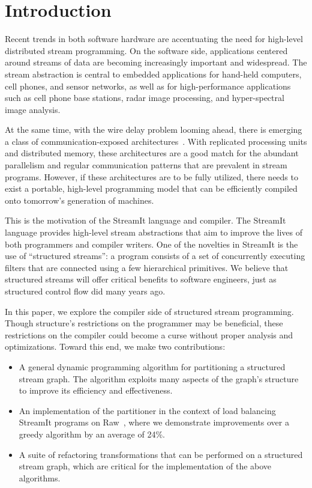 \section{Introduction}

Recent trends in both software hardware are accentuating the need for
high-level distributed stream programming.  On the software side,
applications centered around streams of data are becoming increasingly
important and widespread.  The stream abstraction is central to
embedded applications for hand-held computers, cell phones, and sensor
networks, as well as for high-performance applications such as cell
phone base stations, radar image processing, and hyper-spectral image
analysis.  

At the same time, with the wire delay problem looming ahead, there is
emerging a class of communication-exposed
architectures~\cite{raw-micro,trips,smartmemories}.  With replicated
processing units and distributed memory, these architectures are a
good match for the abundant parallelism and regular communication
patterns that are prevalent in stream programs.  However, if these
architectures are to be fully utilized, there needs to exist a
portable, high-level programming model that can be efficiently
compiled onto tomorrow's generation of machines.

This is the motivation of the StreamIt language and compiler.  The
StreamIt language provides high-level stream abstractions that aim to
improve the lives of both programmers and compiler writers.  One of
the novelties in StreamIt is the use of ``structured streams'': a
program consists of a set of concurrently executing filters that are
connected using a few hierarchical primitives.  We believe that
structured streams will offer critical benefits to software engineers,
just as structured control flow did many years ago.

In this paper, we explore the compiler side of structured stream
programming.  Though structure's restrictions on the programmer may be
beneficial, these restrictions on the compiler could become a curse
without proper analysis and optimizations.  Toward this end, we make
two contributions:
\begin{itemize}

\item A general dynamic programming algorithm for partitioning a
structured stream graph.  The algorithm exploits many aspects of the
graph's structure to improve its efficiency and effectiveness.

\item An implementation of the partitioner in the context of load
balancing StreamIt programs on Raw~\cite{raw-micro}, where we
demonstrate improvements over a greedy algorithm by an average of
24\%.

\item A suite of refactoring transformations that can be performed on
a structured stream graph, which are critical for the implementation
of the above algorithms.
\end{itemize}

